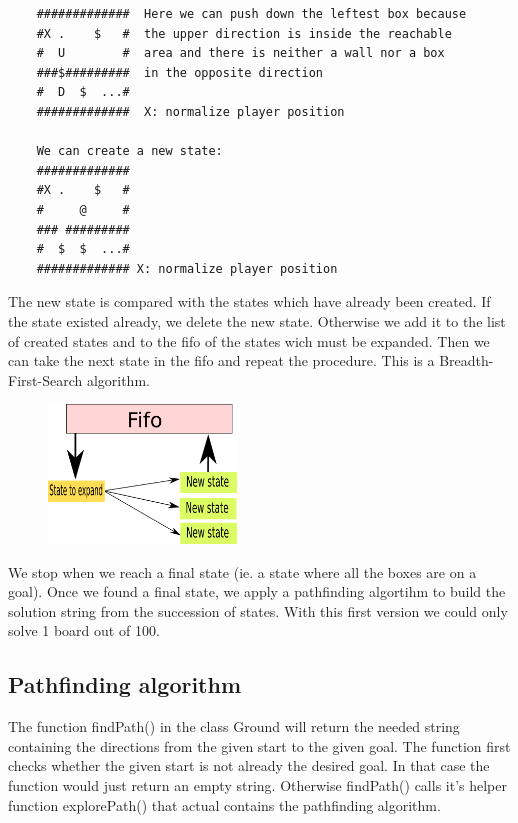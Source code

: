 \documentclass[a4paper,10pt]{article}
\begin{document}
	\begin{verbatim}
	#############  Here we can push down the leftest box because 
	#X .    $   #  the upper direction is inside the reachable 
	#  U        #  area and there is neither a wall nor a box
	###$#########  in the opposite direction
	#  D  $  ...#  
	#############  X: normalize player position

	We can create a new state:
	#############
	#X .    $   #
	#     @     #
	### #########
	#  $  $  ...#
	############# X: normalize player position
	\end{verbatim}

	The new state is compared with the states which have already been created. 
	If the state existed already, we delete the new state.
	Otherwise we add it to the list of created states and to the fifo of the states wich must be expanded.
	Then we can take the next state in the fifo and repeat the procedure.
	This is a Breadth-First-Search algorithm.

	\begin{figure}[h]
	\centerline{\includegraphics[height=5 cm, width=5cm]{./state_fifo.png}}
	\end{figure}

	We stop when we reach a final state (ie. a state where all the boxes are on a goal).
	Once we found a final state, we apply a pathfinding algortihm to build the solution string from the succession of states.
 With this first version we could only solve 1 board out of 100. 

	\subsection{Pathfinding algorithm}

	The function findPath() in the class Ground will return the needed string containing the directions from the given start to 		the given goal. The function first checks whether the given start is not already the desired goal. In that case the function 		would just return an empty string. Otherwise findPath() calls it's helper function explorePath() that actual contains the 		pathfinding algorithm.
\end{document}
